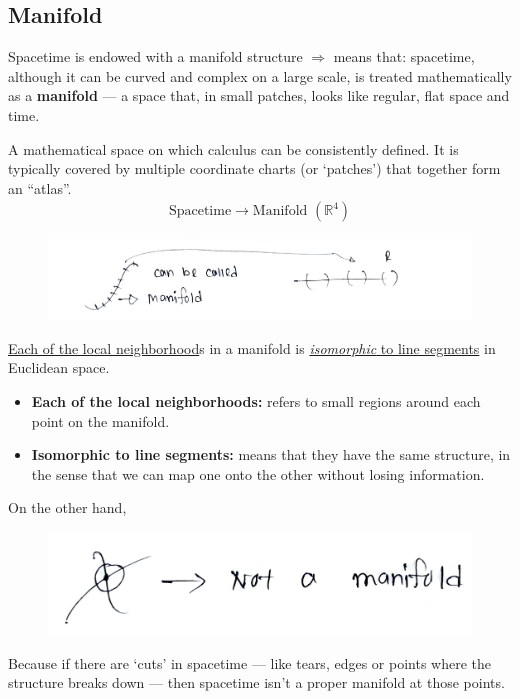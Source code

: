 \documentclass[14pt]{article} %
\begin{document}
\subsection{Manifold}
Spacetime is endowed with a manifold structure $\Rightarrow$ means that: spacetime, although it can be curved and complex on a large scale, is treated mathematically as a \textbf{manifold} — a space that, in small patches, looks like regular, flat space and time.
\begin{tcolorbox}[ title=\textbf{Definition}]
A mathematical space on which calculus can be consistently defined. It is typically covered by multiple coordinate charts (or `patches') that together form an ``atlas''.
\begin{align*}
\text{Spacetime} \rightarrow \text{Manifold } (\mathbb{R}^4)
\end{align*}
\end{tcolorbox}
\vspace{-0.5cm}
\begin{figure}[H]
\centering
\includegraphics[width=0.9\linewidth]{L(-1)_1.jpg}
\caption*{}
\end{figure}
\vspace{-0.9cm}
\noindent
\underline{Each of the local neighborhood}s in a manifold is \underline{\textit{isomorphic} to line segments} in Euclidean space.
\begin{itemize}
  \item \textbf{Each of the local neighborhoods:} refers to small regions around each point on the manifold.
  \item \textbf{Isomorphic to line segments:} means that they have the same structure, in the sense that we can map one onto the other without losing information.
\end{itemize}
On the other hand,
\begin{figure}[H]
\centering
\includegraphics[width=0.5\linewidth]{L(-1)_2.jpg}
\caption*{}
\end{figure}
\vspace{-0.9cm}
\noindent
Because if there are `cuts' in spacetime — like tears, edges or points where the structure breaks down — then spacetime isn't a proper manifold at those points.
\end{document}
